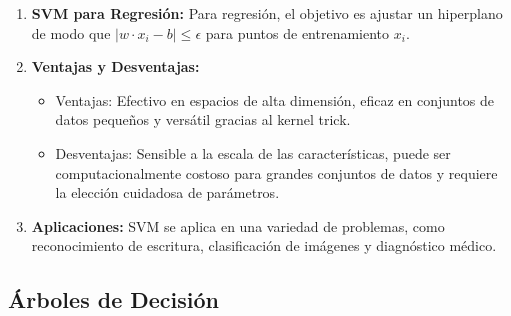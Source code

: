 \documentclass{article}
\begin{document}
\begin{enumerate}
    \item \textbf{SVM para Regresión:}
        Para regresión, el objetivo es ajustar un hiperplano de modo que \(|w \cdot x_i - b| \leq \epsilon\) para puntos de entrenamiento \(x_i\).

    \item \textbf{Ventajas y Desventajas:}
        \begin{itemize}
            \item Ventajas: Efectivo en espacios de alta dimensión, eficaz en conjuntos de datos pequeños y versátil gracias al kernel trick.
            \item Desventajas: Sensible a la escala de las características, puede ser computacionalmente costoso para grandes conjuntos de datos y requiere la elección cuidadosa de parámetros.
        \end{itemize}

    \item \textbf{Aplicaciones:}
        SVM se aplica en una variedad de problemas, como reconocimiento de escritura, clasificación de imágenes y diagnóstico médico.
\end{enumerate}


\subsection{Árboles de Decisión}
\end{document}
